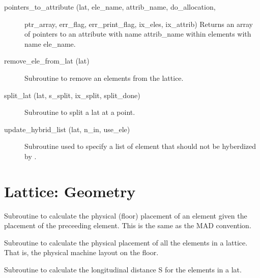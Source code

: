 \begin{description}
\item[pointers_to_attribute (lat, ele_name, attrib_name, do_allocation,] \Newline 
                    ptr_array, err_flag, err_print_flag, ix_eles, ix_attrib)
Returns an array of pointers to an attribute with name attrib_name within 
elements with name ele_name.

\item[remove_ele_from_lat (lat)] \Newline 
Subroutine to remove an elements from the lattice.

\item[split_lat (lat, s_split, ix_split, split_done)] \Newline
Subroutine to split a lat at a point.

\item[update_hybrid_list (lat, n_in, use_ele)] \Newline
Subroutine used to specify a list of element that should not be
hyberdized by .

\end{description}

\section{Lattice: Geometry}
\label{r:geom}     

\begin{description}

\item[ele_geometry (ele0, ele, param)] \Newline 
Subroutine to calculate the physical (floor) placement of an element given the
placement of the preceeding element. This is the same as the MAD convention.

\item[lat_geometry (lat)] \Newline
Subroutine to calculate the physical placement of all the elements in a lattice. 
That is, the physical machine layout on the floor. 

\item[s_calc (lat)] \Newline
Subroutine to calculate the longitudinal distance S for the elements in a lat. 

\end{description}

